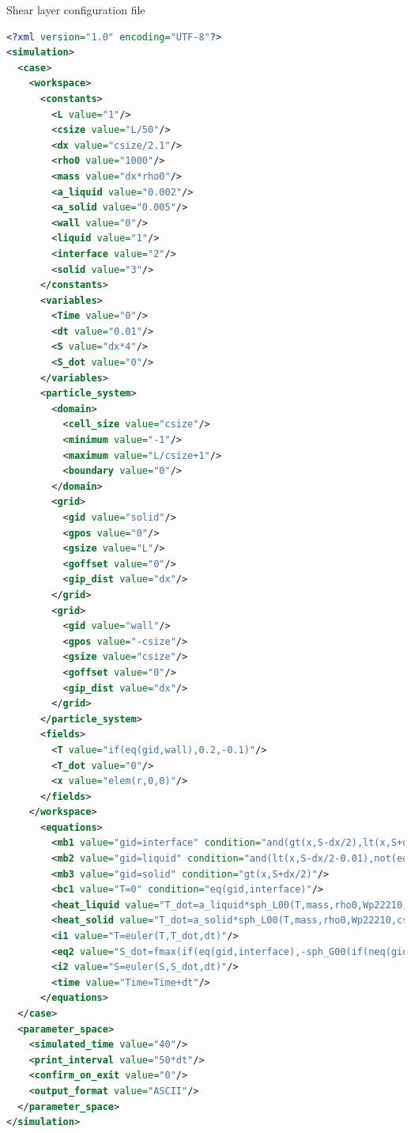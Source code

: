\documentclass[a4paper,12pt,openany]{book}
\theoremstyle{break}
\begin{document}
\begin{samepage}
\begin{example}{Shear layer configuration file}{}
\lstset{basicstyle=\tiny}
\begin{lstlisting}[language=XML]
<?xml version="1.0" encoding="UTF-8"?>
<simulation>
  <case>
    <workspace>
      <constants>
        <L value="1"/>
        <csize value="L/50"/>
        <dx value="csize/2.1"/>
        <rho0 value="1000"/>
        <mass value="dx*rho0"/>
        <a_liquid value="0.002"/>
        <a_solid value="0.005"/>
        <wall value="0"/>
        <liquid value="1"/>
        <interface value="2"/>
        <solid value="3"/>
      </constants>
      <variables>
        <Time value="0"/>
        <dt value="0.01"/>
        <S value="dx*4"/>
        <S_dot value="0"/>
      </variables>
      <particle_system>
        <domain>
          <cell_size value="csize"/>
          <minimum value="-1"/>
          <maximum value="L/csize+1"/>
          <boundary value="0"/>
        </domain>
        <grid>
          <gid value="solid"/>
          <gpos value="0"/>
          <gsize value="L"/>
          <goffset value="0"/>
          <gip_dist value="dx"/>
        </grid>
        <grid>
          <gid value="wall"/>
          <gpos value="-csize"/>
          <gsize value="csize"/>
          <goffset value="0"/>
          <gip_dist value="dx"/>
        </grid>
      </particle_system>
      <fields>
        <T value="if(eq(gid,wall),0.2,-0.1)"/>
        <T_dot value="0"/>
        <x value="elem(r,0,0)"/>
      </fields>
    </workspace>
      <equations>
        <mb1 value="gid=interface" condition="and(gt(x,S-dx/2),lt(x,S+dx/2))"/>
        <mb2 value="gid=liquid" condition="and(lt(x,S-dx/2-0.01),not(eq(gid,wall)))"/>
        <mb3 value="gid=solid" condition="gt(x,S+dx/2)"/>
        <bc1 value="T=0" condition="eq(gid,interface)"/>
        <heat_liquid value="T_dot=a_liquid*sph_L00(T,mass,rho0,Wp22210,csize)" condition="eq(gid,liquid)"/>
        <heat_solid value="T_dot=a_solid*sph_L00(T,mass,rho0,Wp22210,csize)" condition="eq(gid,solid)"/>
        <i1 value="T=euler(T,T_dot,dt)"/>
        <eq2 value="S_dot=fmax(if(eq(gid,interface),-sph_G00(if(neq(gid,solid),T,0),mass,rho0,Wp22210,csize),0))"/>
        <i2 value="S=euler(S,S_dot,dt)"/>
        <time value="Time=Time+dt"/>
      </equations>
  </case>
  <parameter_space>
    <simulated_time value="40"/>
    <print_interval value="50*dt"/>
    <confirm_on_exit value="0"/>
    <output_format value="ASCII"/>
  </parameter_space>
</simulation>
\end{lstlisting}
\end{example}
\end{samepage}
\end{document}
